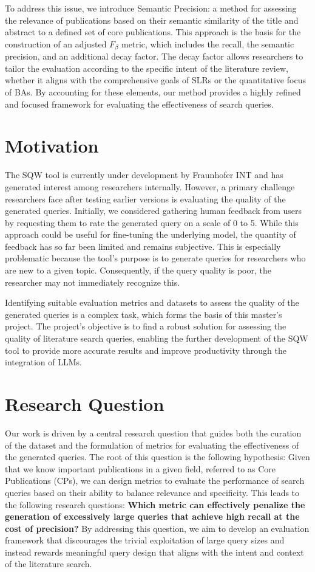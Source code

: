 To address this issue, we introduce Semantic Precision: a method for assessing the relevance of publications based on their semantic similarity of the title and abstract to a defined set of core publications. This approach is the basis for the construction of an adjusted $F_\beta$ metric, which includes the recall, the semantic precision, and an additional decay factor. The decay factor allows researchers to tailor the evaluation according to the specific intent of the literature review, whether it aligns with the comprehensive goals of SLRs or the quantitative focus of BAs. By accounting for these elements, our method provides a highly refined and focused framework for evaluating the effectiveness of search queries.

\section{Motivation}
The SQW tool is currently under development by Fraunhofer INT and has generated interest among researchers internally. However, a primary challenge researchers face after testing earlier versions is evaluating the quality of the generated queries. Initially, we considered gathering human feedback from users by requesting them to rate the generated query on a scale of 0 to 5. While this approach could be useful for fine-tuning the underlying model, the quantity of feedback has so far been limited and remains subjective. This is especially problematic because the tool’s purpose is to generate queries for researchers who are new to a given topic. Consequently, if the query quality is poor, the researcher may not immediately recognize this.

Identifying suitable evaluation metrics and datasets to assess the quality of the generated queries is a complex task, which forms the basis of this master's project. The project’s objective is to find a robust solution for assessing the quality of literature search queries, enabling the further development of the SQW tool to provide more accurate results and improve productivity through the integration of LLMs.


\section{Research Question}\label{sec:researchQuestions}

Our work is driven by a central research question that guides both the curation of the dataset and the formulation of metrics for evaluating the effectiveness of the generated queries. The root of this question is the following hypothesis: Given that we know important publications in a given field, referred to as Core Publications (CPs), we can design metrics to evaluate the performance of search queries based on their ability to balance relevance and specificity. This leads to the following research questions: \textbf{Which metric can effectively penalize the generation of excessively large queries that achieve high recall at the cost of precision?} By addressing this question, we aim to develop an evaluation framework that discourages the trivial exploitation of large query sizes and instead rewards meaningful query design that aligns with the intent and context of the literature search.


